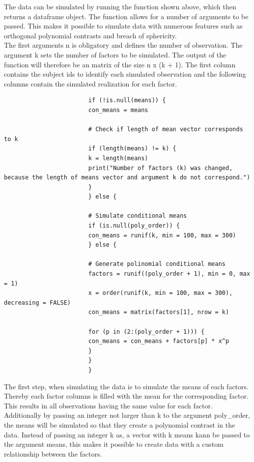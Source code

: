 \documentclass[11pt]{article}
\begin{document}
				 The data can be simulated by running the function shown above, which then returns a dataframe object. The function allows for a number of arguments to be passed. This makes it possible to simulate data with numerous features such as orthogonal polynomial contrasts and breach of sphericity.\\
				 
				 The first arguments n is obligatory and defines the number of observation. The argument k sets the number of factors to be simulated. The output of the function will therefore be an matrix of the size n x (k + 1). The first column contains the subject ids to identify each simulated observation and the following columns contain the simulated realization for each factor.\\
				 
				\begin{lstlisting}
					    if (!is.null(means)) {
					    con_means = means
					    
					    # Check if length of mean vector corresponds to k
					    if (length(means) != k) {
					    k = length(means)
					    print("Number of factors (k) was changed, because the length of means vector and argument k do not correspond.")
					    }
					    } else {
					    
					    # Simulate conditional means
					    if (is.null(poly_order)) {
					    con_means = runif(k, min = 100, max = 300)
					    } else {
					    
					    # Generate polinomial conditional means
					    factors = runif((poly_order + 1), min = 0, max = 1)
					    x = order(runif(k, min = 100, max = 300), decreasing = FALSE)
					    con_means = matrix(factors[1], nrow = k)
					    
					    for (p in (2:(poly_order + 1))) {
					    con_means = con_means + factors[p] * x^p
					    }
					    }
					    }
				\end{lstlisting}
				 
				 The first step, when simulating the data is to simulate the means of each factors. Thereby each factor columns is filled with the mean for the corresponding factor. This results in all observations having the same value for each factor. Additionally by passing an integer not larger than k to the argument poly\_order, the means will be simulated so that they create a polynomial contrast in the data. Instead of passing an integer k as, a vector with k means kann be passed to the argument means, this makes it possible to create data with a custom relationship between the factors.\\
				 
\end{document}
